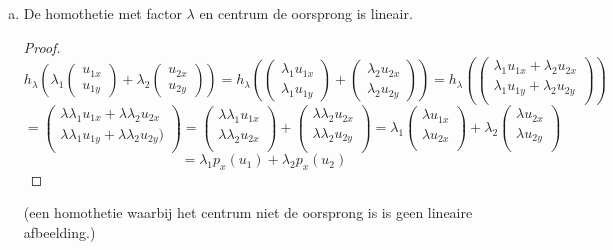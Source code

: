 \documentclass[lineaire_algebra_oplossingen.tex]{subfiles}
\begin{document}
\begin{enumerate}
\begin{enumerate}[a)]
\item De homothetie met factor $\lambda$ en centrum de oorsprong is lineair.
\begin{proof}
\[
h_\lambda \left(\lambda_1
\begin{pmatrix}
u_{1x}\\u_{1y}
\end{pmatrix} 
+ \lambda_2
\begin{pmatrix}
u_{2x}\\u_{2y}
\end{pmatrix} \right)
 = 
h_\lambda \left(
\begin{pmatrix}
\lambda_1u_{1x}\\\lambda_1u_{1y}
\end{pmatrix} 
+ 
\begin{pmatrix}
\lambda_2u_{2x}\\\lambda_2u_{2y}
\end{pmatrix} \right)
=
h_\lambda \left(
\begin{pmatrix}
\lambda_1u_{1x}+\lambda_2u_{2x}\\\lambda_1u_{1y}+\lambda_2u_{2y}\\
\end{pmatrix} \right)
\]
\[
= 
\begin{pmatrix}
\lambda\lambda_1u_{1x}+\lambda\lambda_2u_{2x}\\\lambda\lambda_1u_{1y}+\lambda\lambda_2u_{2y})\\
\end{pmatrix} 
=
\begin{pmatrix}
\lambda\lambda_1u_{1x}\\\lambda\lambda_2u_{2x}\\
\end{pmatrix}
+
\begin{pmatrix}
\lambda\lambda_2u_{2x}\\\lambda\lambda_2u_{2y}\\
\end{pmatrix}
=
\lambda_1
\begin{pmatrix}
\lambda u_{1x}\\\lambda u_{2x}\\
\end{pmatrix}
+
\lambda_2
\begin{pmatrix}
\lambda u_{2x}\\\lambda u_{2y}\\
\end{pmatrix}
\]
\[
=
\lambda_1p_x(u_1) + \lambda_2p_x(u_2)
\]
\end{proof}
(een homothetie waarbij het centrum niet de oorsprong is is geen lineaire afbeelding.)
\end{enumerate}


\end{enumerate}
\end{document}
